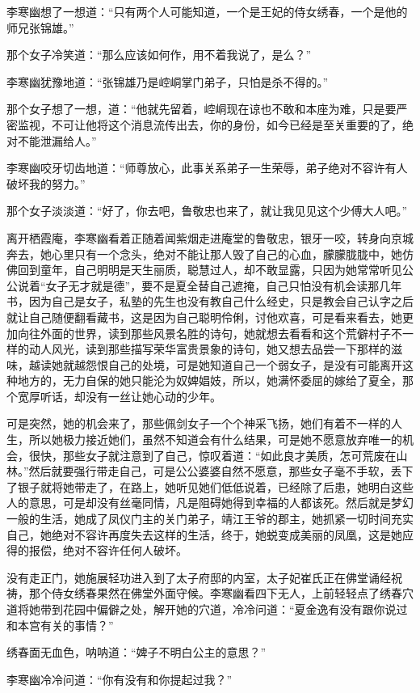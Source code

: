 李寒幽想了一想道：“只有两个人可能知道，一个是王妃的侍女绣春，一个是他的师兄张锦雄。”

那个女子冷笑道：“那么应该如何作，用不着我说了，是么？”

李寒幽犹豫地道：“张锦雄乃是崆峒掌门弟子，只怕是杀不得的。”

那个女子想了一想，道：“他就先留着，崆峒现在谅也不敢和本座为难，只是要严密监视，不可让他将这个消息流传出去，你的身份，如今已经是至关重要的了，绝对不能泄漏给人。”

李寒幽咬牙切齿地道：“师尊放心，此事关系弟子一生荣辱，弟子绝对不容许有人破坏我的努力。”

那个女子淡淡道：“好了，你去吧，鲁敬忠也来了，就让我见见这个少傅大人吧。”

离开栖霞庵，李寒幽看着正随着闻紫烟走进庵堂的鲁敬忠，银牙一咬，转身向京城奔去，她心里只有一个念头，绝对不能让那人毁了自己的心血，朦朦胧胧中，她仿佛回到童年，自己明明是天生丽质，聪慧过人，却不敢显露，只因为她常常听见公公说着“女子无才就是德”，要不是夏全替自己遮掩，自己只怕没有机会读那几年书，因为自己是女子，私塾的先生也没有教自己什么经史，只是教会自己认字之后就让自己随便翻看藏书，这是因为自己聪明伶俐，讨他欢喜，可是看来看去，她更加向往外面的世界，读到那些风景名胜的诗句，她就想去看看和这个荒僻村子不一样的动人风光，读到那些描写荣华富贵景象的诗句，她又想去品尝一下那样的滋味，越读她就越怨恨自己的处境，可是她知道自己一个弱女子，是没有可能离开这种地方的，无力自保的她只能沦为奴婢娼妓，所以，她满怀委屈的嫁给了夏全，那个宽厚听话，却没有一丝让她心动的少年。

可是突然，她的机会来了，那些佩剑女子一个个神采飞扬，她们有着不一样的人生，所以她极力接近她们，虽然不知道会有什么结果，可是她不愿意放弃唯一的机会，很快，那些女子就注意到了自己，惊叹着道：“如此良才美质，怎可荒废在山林。”然后就要强行带走自己，可是公公婆婆自然不愿意，那些女子毫不手软，丢下了银子就将她带走了，在路上，她听见她们低低说着，已经除了后患，她明白这些人的意思，可是却没有丝毫同情，凡是阻碍她得到幸福的人都该死。然后就是梦幻一般的生活，她成了凤仪门主的关门弟子，靖江王爷的郡主，她抓紧一切时间充实自己，她绝对不容许再度失去这样的生活，终于，她蜕变成美丽的凤凰，这是她应得的报偿，绝对不容许任何人破坏。

没有走正门，她施展轻功进入到了太子府邸的内室，太子妃崔氏正在佛堂诵经祝祷，那个侍女绣春果然在佛堂外面守候。李寒幽看四下无人，上前轻轻点了绣春穴道将她带到花园中偏僻之处，解开她的穴道，冷冷问道：“夏金逸有没有跟你说过和本宫有关的事情？”

绣春面无血色，呐呐道：“婢子不明白公主的意思？”

李寒幽冷冷问道：“你有没有和你提起过我？”

